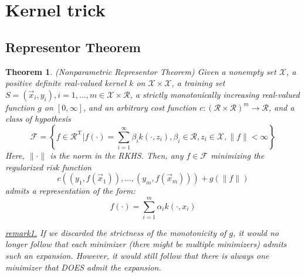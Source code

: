 \documentclass{article}
\newtheorem{theorem}{Theorem}
\begin{document}
\section{Kernel trick}

\subsection{Representor Theorem}

	\begin{theorem}(Nonparametric Representor Theorem)
	Given a nonempty set $\mathcal{X}$, a positive definite real-valued kernel $k$ on $\mathcal{X}\times \mathcal{X}$, a training set $S={(\vec{x}_i, y_i), i=1,...,m}\in \mathcal{X}\times\mathcal{R}$, a strictly monotonically increasing real-valued function $g$ on $[0,\infty]$, and an arbitrary cost function $c:(\mathcal{R}\times \mathcal{R})^m\rightarrow \mathcal{R}$, and a class of hypothesis 
	\begin{equation*}
	\mathcal{F}=\left\{ f\in \mathcal{R}^{\mathcal{X}}|f(\cdot) = \sum_{i=1}^\infty \beta_i k(\cdot,z_i),  \beta_i\in \mathcal{R}, z_i\in\mathcal{X}, \|f\|<\infty \right\}
	\end{equation*}
Here, $\|\cdot\|$ is the norm in the RKHS. Then, any $f\in\mathcal{F}$ minimizing the regularized risk function
	\begin{equation*}
	c((y_1, f(\vec{x}_1)), ..., (y_m, f(\vec{x}_m))) + g(\|f\|)
	\end{equation*}
admits a representation of the form:
	\begin{equation}
	f(\cdot) = \sum_{i=1}^m \alpha_i k(\cdot, x_i)
	\end{equation}
	\end{theorem}
	
	\vspace{2mm}
	\begin{scriptsize}
	\begin{spacing}{1.2}
	{\sffamily
	\noindent\textit{\underline{remark1.} If we discarded the strictness of the monotonicity of $g$, it would no longer follow that each minimizer (there might be multiple minimizers) admits such an expansion. However, it would still follow that there is always one minimizer that DOES admit the expansion.}}
	\end{spacing}
	\end{scriptsize}
	\vspace{-2mm}
\end{document}
